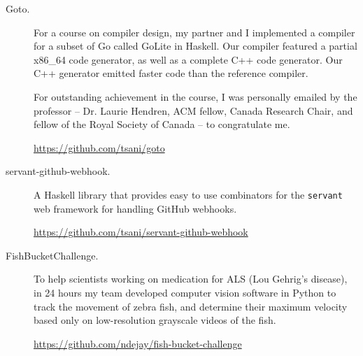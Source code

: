 \documentclass{article}
\begin{document}
\begin{description}
    \item[Goto.] For a course on compiler design, my partner and I implemented
        a compiler for a subset of Go called GoLite in Haskell. Our compiler
        featured a partial x86\_64 code generator, as well as a complete C++
        code generator. Our C++ generator emitted faster code than the
        reference compiler.

        For outstanding achievement in the course, I was personally emailed by
        the professor -- Dr. Laurie Hendren, ACM fellow, Canada Research Chair,
        and fellow of the Royal Society of Canada -- to congratulate me.

        \url{https://github.com/tsani/goto}

    \item[servant-github-webhook.] A Haskell library that provides easy to
        use combinators for the \texttt{servant} web framework for handling
        GitHub webhooks.

        \url{https://github.com/tsani/servant-github-webhook}



    \item[FishBucketChallenge.] To help scientists working on medication for
        ALS (Lou Gehrig's disease), in 24 hours my team developed computer
        vision software in Python to track the movement of zebra fish, and
        determine their maximum velocity based only on low-resolution grayscale
        videos of the fish.

        \url{https://github.com/ndejay/fish-bucket-challenge}





\end{description}
\end{document}
